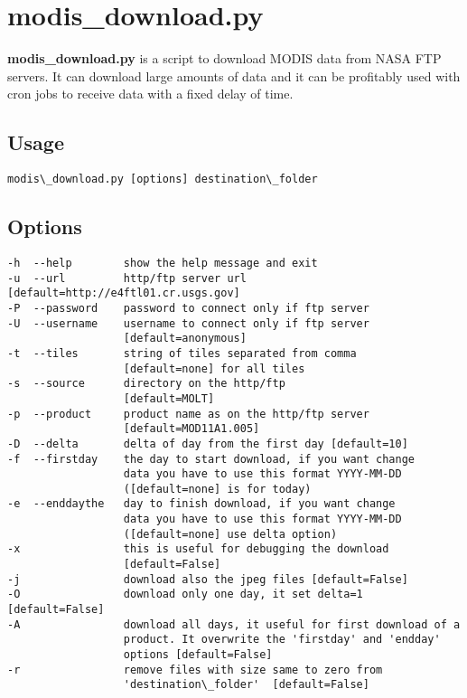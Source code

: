 \documentclass[a4paper,11pt,oneside]{sphinxmanual}
\begin{document}
\section{modis\_download.py}
\label{scripts/modis_download:modis-download-py}\label{scripts/modis_download::doc}
\textbf{modis\_download.py} is a script to download MODIS data from NASA FTP servers. It can download large amounts of data and it can be profitably used with cron jobs to receive data with a fixed delay of time.


\subsection{Usage}
\label{scripts/modis_download:usage}
\begin{Verbatim}[commandchars=\\\{\}]
modis\_download.py [options] destination\_folder
\end{Verbatim}


\subsection{Options}
\label{scripts/modis_download:options}
\begin{Verbatim}[commandchars=\\\{\}]
-h  --help        show the help message and exit
-u  --url         http/ftp server url [default=http://e4ftl01.cr.usgs.gov]
-P  --password    password to connect only if ftp server
-U  --username    username to connect only if ftp server
                  [default=anonymous]
-t  --tiles       string of tiles separated from comma
                  [default=none] for all tiles
-s  --source      directory on the http/ftp
                  [default=MOLT]
-p  --product     product name as on the http/ftp server
                  [default=MOD11A1.005]
-D  --delta       delta of day from the first day [default=10]
-f  --firstday    the day to start download, if you want change
                  data you have to use this format YYYY-MM-DD
                  ([default=none] is for today)
-e  --enddaythe   day to finish download, if you want change
                  data you have to use this format YYYY-MM-DD
                  ([default=none] use delta option)
-x                this is useful for debugging the download
                  [default=False]
-j                download also the jpeg files [default=False]
-O                download only one day, it set delta=1 [default=False]
-A                download all days, it useful for first download of a
                  product. It overwrite the 'firstday' and 'endday'
                  options [default=False]
-r                remove files with size same to zero from
                  'destination\_folder'  [default=False]
\end{Verbatim}
\end{document}
